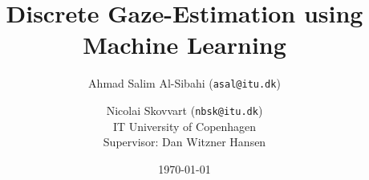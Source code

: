 \documentclass[a4paper]{article}%
\begin{document}
\title{Discrete Gaze-Estimation using Machine Learning}
\author{Ahmad Salim Al-Sibahi (\texttt{asal@itu.dk}) \and Nicolai Skovvart (\texttt{nbsk@itu.dk})\\IT University of Copenhagen\\Supervisor: Dan Witzner Hansen}
\date{\today}


\maketitle



\tableofcontents
\clearpage












%



\let\Section\section  %
\def\section*#1{\Section{#1}} 


\appendix

%
\end{document}
